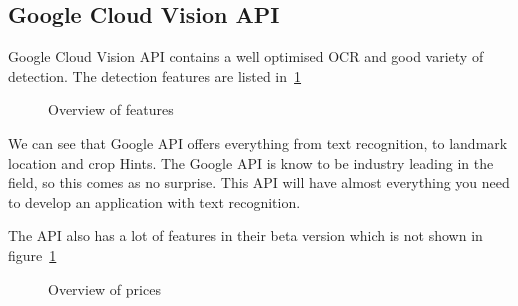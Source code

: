\subsection{Google Cloud Vision API}\label{subsec:API_Google}

Google Cloud Vision API contains a well optimised OCR and good variety of detection.
The detection features are listed in~\ref{fig:Google cloud API features}

\begin{figure}[h]
    \caption{Overview of features~\cite{GoogleCloudPricing}}
    \label{fig:Google cloud API features}
\end{figure}

We can see that Google API offers everything from text recognition, to landmark location and crop Hints.
The Google API is know to be industry leading in the field, so this comes as no surprise.
This API will have almost everything you need to develop an application with text recognition.

The API also has a lot of features in their beta version which is not shown in figure~\ref{fig:Google cloud API features}
\clearpage

\begin{figure}[h]
    \caption{Overview of prices~\cite{GoogleCloudPricing}}
    \label{fig:Google cloud API prices}
\end{figure}

